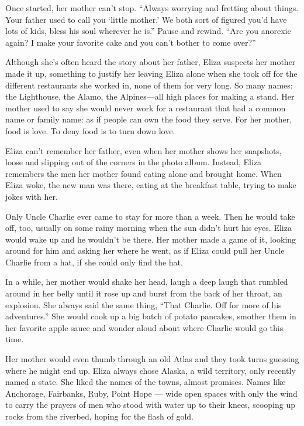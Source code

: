 \documentclass[twoside,10pt]{book}
\begin{document}
Once started, her mother can't stop. ``Always worrying and fretting
about things. Your father used to call you `little mother.' We both sort
of figured you'd have lots of kids, bless his soul wherever he is.''
Pause and rewind. ``Are you anorexic again? I make your favorite cake
and you can't bother to come over?''

Although she's often heard the story about her father, Eliza suspects
her mother made it up, something to justify her leaving Eliza alone when
she took off for the different restaurants she worked in, none of them
for very long. So many names: the Lighthouse, the Alamo, the
Alpines---all high places for making a stand. Her mother used to say she
would never work for a restaurant that had a common name or family name:
as if people can own the food they serve. For her mother, food is love.
To deny food is to turn down love.

Eliza can't remember her father, even when her mother shows her
snapshots, loose and slip­ping out of the corners in the photo album.
Instead, Eliza remembers the men her mother found eat­ing alone and
brought home. When Eliza woke, the new man was there, eating at the
breakfast table, trying to make jokes with her.

Only Uncle Charlie ever came to stay for more than a week. Then he would
take off, too, usu­ally on some rainy morning when the sun didn't hurt
his eyes. Eliza would wake up and he wouldn't be there. Her mother made
a game of it, looking around for him and asking her where he went, as if
Eliza could pull her Uncle Charlie from a hat, if she could only find
the hat.

In a while, her mother would shake her head, laugh a deep laugh that
rumbled around in her belly until it rose up and burst from the back of
her throat, an explosion. She always said the same thing, ``That
Charlie. Off for more of his adventures.'' She would cook up a big batch
of potato pan­cakes, smother them in her favorite apple sauce and wonder
aloud about where Charlie would go this time.

Her mother would even thumb through an old Atlas and they took turns
guessing where he might end up. Eliza always chose Alaska, a wild
territory, only recently named a state. She liked the names of the
towns, almost promises. Names like Anchorage, Fairbanks, Ruby, Point
Hope --- wide open spaces with only the wind to carry the prayers of men
who stood with water up to their knees, scooping up rocks from the
riverbed, hoping for the flash of gold.
\end{document}
